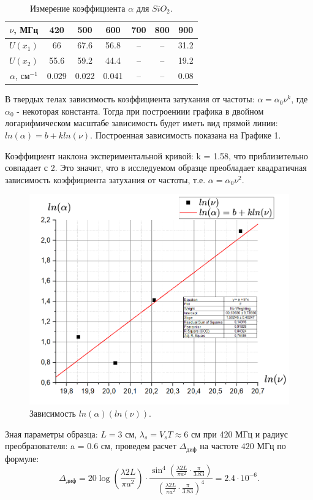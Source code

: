 \documentclass[a4paper, 12pt]{article}
\begin{document}
\begin{table}[h]
\centering
\begin{tabular}{|c|c|c|c|c|c|c|}
\hline
 $\nu$, МГц& 420 & 500 & 600 & 700 & 800 & 900 \\ \hline
 $U(x_1)$& 66 & 67.6 & 56.8 & -- & -- & 31.2 \\ \hline
 $U(x_2)$& 55.6 & 59.2 & 44.4 & -- & -- & 19.2 \\ \hline
 $\alpha$, см$^{-1}$ & 0.029 & 0.022 & 0.041 & -- & -- & 0.08 \\ \hline
\end{tabular}
\label{table-a}
\caption{Измерение коэффициента $\alpha$ для $SiO_2$.}
\end{table}

 В твердых телах зависимость коэффициента затухания от частоты: $\alpha = \alpha_0 \nu^k$, где $\alpha_0$ - некоторая константа. Тогда при построениии графика в двойном логарифмическом масштабе зависимость будет иметь вид прямой линии: $ln(\alpha)=b+kln(\nu)$.   Построенная зависимость показана на Графике 1.

 Коэффициент наклона экспериментальной кривой: k = 1.58, что приблизительно совпадает с 2. Это значит, что в исследуемом образце преобладает квадратичная зависимость коэффициента затухания от частоты, т.е. $\alpha = \alpha_0 \nu^2$.

\newpage

\begin{figure}
    \centering
    \includegraphics[width=0.8\linewidth]{img/Снимок экрана 2025-02-25 230732.png}
    \caption{Зависимость $ln(\alpha)(ln(\nu))$.}
    \label{fig-a}
\end{figure}

  Зная параметры образца:
$L= 3$ см, $\lambda_s=V_sT \approx 6$ см при 420 МГц и радиус преобразователя: a = 0.6 см,
проведем расчет $\Delta_{\text{диф}}$ на частоте $420$ МГц по формуле:
$$
			\Delta_{\text{диф}}=20 \log(\frac{\lambda 2L}{\pi a^2})\cdot\frac{\sin^4(\frac{\lambda 2L}{\pi a^2}\cdot\frac{\pi}{3.83})}{(\frac{\lambda 2L}{\pi a^2}\cdot\frac{\pi}{3.83})^4}=2.4\cdot 10^{-6}.
$$
\end{document}
